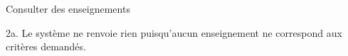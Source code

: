 \begin{ocl}
\begin{usecase}{Consulter des enseignements}
 \begin{extension}
 \item [2a.] Le système ne renvoie rien puisqu'aucun enseignement ne correspond aux critères demandés.
 \end{extension}
\end{usecase}


\begin{comment}
 \subsection{Instantanés et contraintes OCL sur les cas d'utilisation}
 \indent Nous allons vous présenter, dans cette sous-partie, un ensemble représentatif d'instantanés des cas d'utilisation. Nous allons donc partir d'un système vide (seul le département est représenté avec un module et deux enseignements) pour ensuite illustrer l'évolution de notre système au cours de son utilisation.\\
 \indent Voici le diagramme d'instances qui va nous servir de point de départ pour nos instantanés (nous considérons comme triviale la création des modules et des enseignements associés à un département) :

 \begin{figure}[!htbp]
 \begin{center}
 \texttt{[image: fig/base.jpg]}
 \caption{Instantané de départ}
 \end{center}
 \end{figure}

 \subsubsection{Assigner un enseignant à un département}
 \indent Cas d'utilisation : non mentionné car basique - Acteur : \textbf{Chef de département}.

 \begin{figure}[!htbp]
 \begin{center}
 \texttt{[image: fig/1-assignEnseignant.jpg]}
 \caption{Assignation d'un enseignant}
 \end{center}
 \end{figure}

 \indent L'assignation d'un nouvel enseignant au département provoque l'ajout d'une instance de la classe \textbf{Enseignant} ainsi que du contrat de service qui lui est associé (instance de la classe \textbf{ContratDeService}).

 \begin{verbatim}
 context fr.nantes.gl.model.departement.Departement::assignerEnseignant(e : Enseignant)
 post : self.enseignant.include(e)
        and not e.contratdeservice.isUndefined()
 \end{verbatim}
 \emph{L'enseignant appartient au département et possède un contrat de service unique. L'assignation provient du chef de département.}








\end{comment}
\end{ocl}
